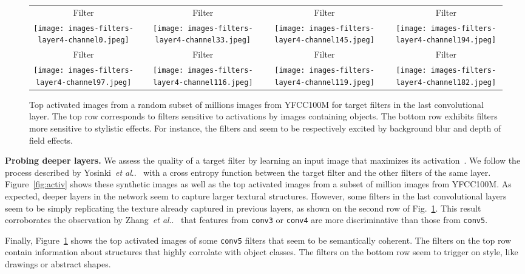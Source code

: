\documentclass[runningheads]{llncs}
\makeatletter
\DeclareRobustCommand\onedot{\futurelet\@let@token\@onedot}
\def\@onedot{\ifx\@let@token.\else.\null\fi\xspace}
\def\etal{\emph{et al}\onedot}
\makeatother
\begin{document}
\begin{figure}[t]
\centering
\begin{tabular}{ccccccc}
Filter  && Filter  && Filter  && Filter 
\\
\texttt{[image: images-filters-layer4-channel0.jpeg]}&&
\texttt{[image: images-filters-layer4-channel33.jpeg]}&&
\texttt{[image: images-filters-layer4-channel145.jpeg]}&&
\texttt{[image: images-filters-layer4-channel194.jpeg]}
\\
Filter  && Filter  && Filter  && Filter 
\\
\texttt{[image: images-filters-layer4-channel97.jpeg]}&&
\texttt{[image: images-filters-layer4-channel116.jpeg]}&&
\texttt{[image: images-filters-layer4-channel119.jpeg]}&&
\texttt{[image: images-filters-layer4-channel182.jpeg]}
\end{tabular}
\caption{
  Top  activated images from a random subset of  millions images from YFCC100M for target filters in the last convolutional layer.
  The top row corresponds to filters sensitive to activations by images containing objects.
  The bottom row exhibits filters more sensitive to stylistic effects.
  For instance, the filters  and  seem to be respectively excited by background blur and depth of field effects.
}
\label{fig:waouh}
\end{figure}

\noindent\textbf{Probing deeper layers.}
We assess the quality of a target filter by learning an input image that maximizes its activation~\cite{erhan2009visualizing,zeiler2014visualizing}.
We follow the process described by Yosinki~\etal~\cite{yosinski2015understanding} with a
cross entropy function between the target filter and the other filters of the same layer.
Figure~\ref{fig:activ} shows these synthetic images as well as the  top activated images from a subset of  million images
from YFCC100M.
As expected, deeper layers in the network seem to capture larger textural structures.
However, some filters in the last convolutional layers seem to be simply replicating
the texture already captured in previous layers, as shown on the second row of Fig.~\ref{fig:waouh}.
This result corroborates the observation by Zhang~\etal~\cite{zhang2016split} that features
from \texttt{conv3} or \texttt{conv4} are more discriminative than those from \texttt{conv5}.

Finally, Figure~\ref{fig:waouh} shows the top  activated images of some \texttt{conv5} filters that seem to be semantically coherent.
The filters on the top row contain information about structures that highly corrolate with object classes.
The filters on the bottom row seem to trigger on style, like drawings or abstract shapes.
\end{document}
